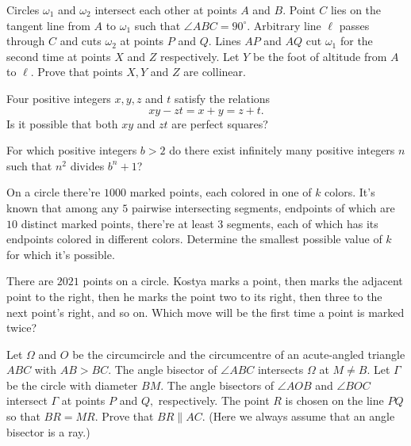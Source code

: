 \documentclass[11pt]{scrartcl}
\begin{document}
\begin{problem}[4674406086325821196]
	Circles $\omega_1$ and $\omega_2$ intersect each other at points $A$ and $B$. Point $C$ lies on the tangent line from $A$ to $\omega_1$ such that
$\angle ABC = 90^\circ$. Arbitrary line $\ell$ passes through $C$ and cuts $\omega_2$ at points $P$ and $Q$. Lines $AP$ and $AQ$ cut $\omega_1$ for the second time at points $X$ and $Z$ respectively. Let $Y$ be the foot of altitude from $A$ to $\ell$. Prove that points $X, Y$ and $Z$ are collinear.
\end{problem}
\begin{problem}[4678973565823282552]
Four positive integers $x,y,z$ and $t$ satisfy the relations
\[ xy - zt = x + y = z + t. \]Is it possible that both $xy$ and $zt$ are perfect squares?
\end{problem}
\begin{problem}[4679791554410865501]
For which positive integers $b > 2$ do there exist infinitely many positive integers $n$ such that $n^2$ divides $b^n+1$?
\end{problem}
\begin{problem}[4738483219849723703]
On a circle there're $1000$ marked points, each colored in one of $k$ colors. It's known that among any $5$ pairwise intersecting segments, endpoints of which are $10$ distinct marked points, there're at least $3$ segments, each of which has its endpoints colored in different colors. Determine the smallest possible value of $k$ for which it's possible.
\end{problem}
\begin{problem}[4742951979457606021]
There are $2021$ points on a circle. Kostya marks a point, then marks the adjacent point to the right, then he marks the point two to its right, then three to the next point's right, and so on. Which move will be the first time a point is marked twice?
\end{problem}
\begin{problem}[4752965628566204727]
Let $\Omega$ and $O$ be the circumcircle and the circumcentre of an acute-angled triangle $ABC$ with $AB > BC$. The angle bisector of $\angle ABC$ intersects $\Omega$ at $M \ne B$. Let $\Gamma$ be the circle with diameter $BM$. The angle bisectors of $\angle AOB$ and $\angle BOC$ intersect $\Gamma$ at points $P$ and $Q,$ respectively. The point $R$ is chosen on the line $P Q$ so that $BR = MR$. Prove that $BR\parallel AC$.
(Here we always assume that an angle bisector is a ray.)
\end{problem}
\end{document}
